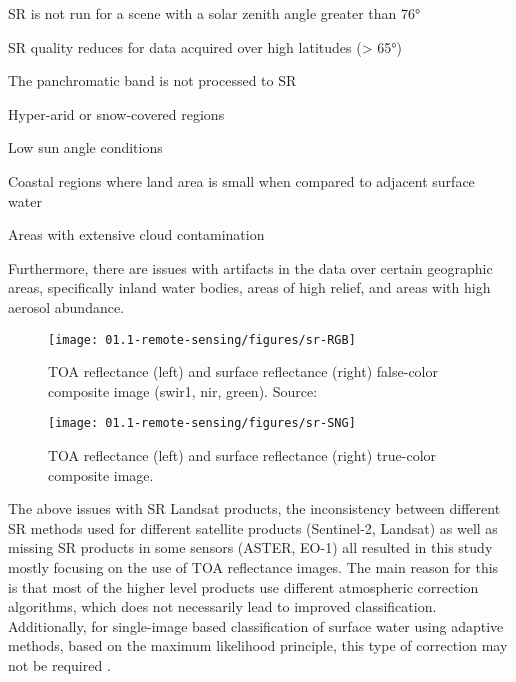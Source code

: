 \begin{enumerate*}[label=(\emph{\alph*})]
	\item SR is not run for a scene with a solar zenith angle greater than 76°
	\item SR quality reduces for data acquired over high latitudes (> 65°)
	\item The panchromatic band is not processed to SR
	\item Hyper-arid or snow-covered regions
	\item Low sun angle conditions
	\item Coastal regions where land area is small when compared to adjacent surface water
	\item Areas with extensive cloud contamination
\end{enumerate*}

Furthermore, there are issues with artifacts in the data over certain geographic areas, specifically inland water bodies, areas of high relief, and areas with high aerosol abundance. 

\begin{figure}
	\texttt{[image: 01.1-remote-sensing/figures/sr-RGB]}
	\caption{TOA reflectance (left) and surface reflectance (right) false-color composite image (swir1, nir, green). Source: }
	\label{fig:example-sr-rgb}
\end{figure}

\begin{figure}
	\texttt{[image: 01.1-remote-sensing/figures/sr-SNG]}
	\caption{TOA reflectance (left) and surface reflectance (right) true-color composite image. }
	\label{fig:example-sr-sng}
\end{figure}

The above issues with SR Landsat products, the inconsistency between different SR methods used for different satellite products (Sentinel-2, Landsat) as well as missing SR products in some sensors (ASTER, EO-1) all resulted in this study mostly focusing on the use of TOA reflectance images. The main reason for this is that most of the higher level products use different atmospheric correction algorithms, which does not necessarily lead to improved classification. Additionally, for single-image based classification of surface water using adaptive methods, based on the maximum likelihood principle, this type of correction may not be required \citet{song2001classification}.


